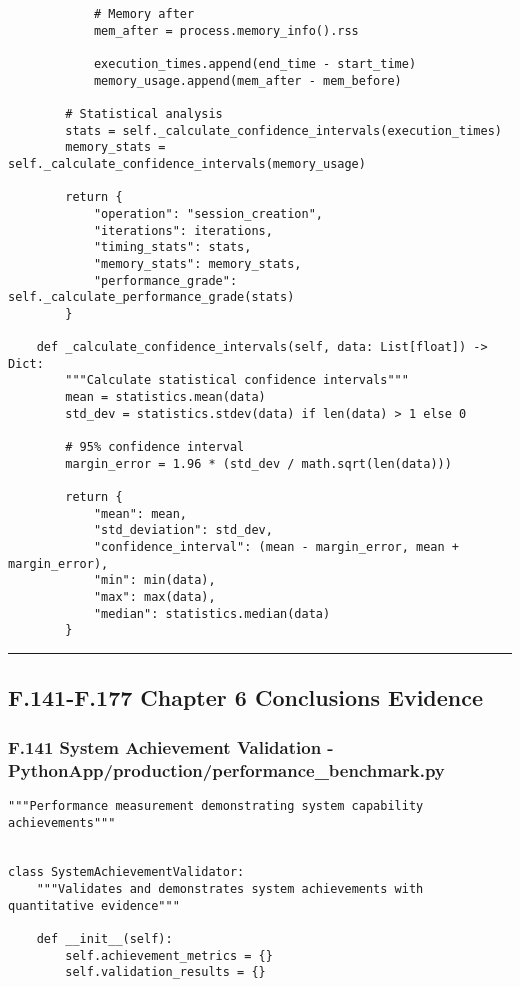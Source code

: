 \documentclass[12pt,a4paper]{report}
\begin{document}
{{\begin{verbatim}
            # Memory after
            mem_after = process.memory_info().rss

            execution_times.append(end_time - start_time)
            memory_usage.append(mem_after - mem_before)

        # Statistical analysis
        stats = self._calculate_confidence_intervals(execution_times)
        memory_stats = self._calculate_confidence_intervals(memory_usage)

        return {
            "operation": "session_creation",
            "iterations": iterations,
            "timing_stats": stats,
            "memory_stats": memory_stats,
            "performance_grade": self._calculate_performance_grade(stats)
        }

    def _calculate_confidence_intervals(self, data: List[float]) -> Dict:
        """Calculate statistical confidence intervals"""
        mean = statistics.mean(data)
        std_dev = statistics.stdev(data) if len(data) > 1 else 0

        # 95% confidence interval
        margin_error = 1.96 * (std_dev / math.sqrt(len(data)))

        return {
            "mean": mean,
            "std_deviation": std_dev,
            "confidence_interval": (mean - margin_error, mean + margin_error),
            "min": min(data),
            "max": max(data),
            "median": statistics.median(data)
        }
\end{verbatim}

\hrule

\subsection{F.141-F.177 Chapter 6 Conclusions Evidence}

\subsubsection{F.141 System Achievement Validation - PythonApp/production/performance_benchmark.py}

\begin{verbatim}
"""Performance measurement demonstrating system capability achievements"""


class SystemAchievementValidator:
    """Validates and demonstrates system achievements with quantitative evidence"""

    def __init__(self):
        self.achievement_metrics = {}
        self.validation_results = {}


\end{verbatim}}}
\end{document}
